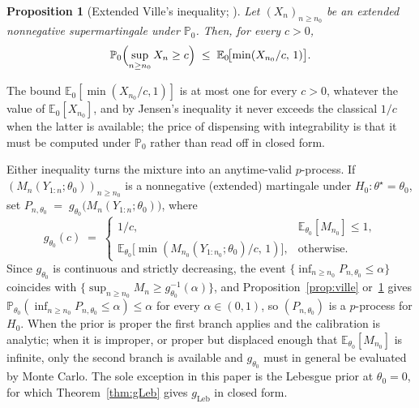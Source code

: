 \documentclass[numsec,webpdf,modern,medium,namedate]{oup-authoring-template}
\theoremstyle{thmstyleone}%
\newtheorem{proposition}[theorem]{Proposition}%
\theoremstyle{thmstyletwo}%
\theoremstyle{thmstylethree}%
\newcommand{\E}{\mathbb{E}}
\newcommand{\Prob}{\mathbb{P}}
\newcommand{\Leb}{\mathrm{Leb}}
\newcommand{\1}{\mathbf{1}}
\begin{document}
\begin{proposition}[Extended Ville's inequality;
{\citealp[Thm.~4.1]{wang2025extended}}]\label{prop:eville}
Let $(X_n)_{n\geq n_0}$ be an extended nonnegative supermartingale under $\Prob_0$. Then, for every $c>0$,
\[
   \Prob_0\Bigl(\sup_{n\geq n_0} X_n\geq c\Bigr)
   \;\leq\;\E_0\!\bigl[\min(X_{n_0}/c,\,1)\bigr].
\]
\end{proposition}

The bound $\E_0[\min(X_{n_0}/c,1)]$ is at most one for every $c>0$, whatever the
value of $\E_0[X_{n_0}]$, and by Jensen's inequality it never exceeds the classical
$1/c$ when the latter is available; the price of dispensing with integrability is
that it must be computed under $\Prob_0$ rather than read off in closed form.

Either inequality turns the mixture into an anytime-valid $p$-process. If
$(M_n(Y_{1:n};\theta_0))_{n\geq n_0}$ is a nonnegative (extended) martingale under
$H_0:\theta^\star=\theta_0$, set $P_{n,\theta_0}\;=\;g_{\theta_0}\bigl(M_n(Y_{1:n};\theta_0)\bigr)$, where
\begin{equation}\label{eq:gtheta0}
  g_{\theta_0}(c)\;=\;
   \begin{cases}
     1/c, & \E_{\theta_0}[M_{n_0}]\leq 1,\\[4pt]
     \E_{\theta_0}\!\bigl[\min(M_{n_0}(Y_{1:n_0};\theta_0)/c,\,1)\bigr], & \text{otherwise}.
   \end{cases}
\end{equation}
Since $g_{\theta_0}$ is continuous and strictly decreasing, the event
$\{\inf_{n\geq n_0}P_{n,\theta_0}\leq\alpha\}$ coincides with
$\{\sup_{n\geq n_0}M_n\geq g_{\theta_0}^{-1}(\alpha)\}$, and
Proposition~\ref{prop:ville} or~\ref{prop:eville} gives
$\Prob_{\theta_0}(\inf_{n\geq n_0}P_{n,\theta_0}\leq\alpha)\leq\alpha$ for every
$\alpha\in(0,1)$, so $(P_{n,\theta_0})$ is a $p$-process for $H_0$. When the prior
is proper the first branch applies and the calibration is analytic; when it is
improper, or proper but displaced enough that $\E_{\theta_0}[M_{n_0}]$ is infinite,
only the second branch is available and $g_{\theta_0}$ must in general be evaluated
by Monte Carlo. The sole exception in this paper is the Lebesgue prior at
$\theta_0=0$, for which Theorem~\ref{thm:gLeb} gives $g_{\Leb}$ in closed form.
\end{document}
